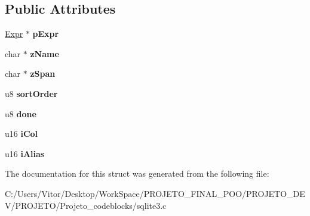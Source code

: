 \subsection*{Public Attributes}
\begin{DoxyCompactItemize}
\item 
\hypertarget{struct_expr_list_1_1_expr_list__item_a75906cf3ff19e5bf16373fec7f3c79ad}{\hyperlink{struct_expr}{Expr} $\ast$ {\bfseries p\-Expr}}\label{struct_expr_list_1_1_expr_list__item_a75906cf3ff19e5bf16373fec7f3c79ad}

\item 
\hypertarget{struct_expr_list_1_1_expr_list__item_af278eb03a1169c73d144547adaf9b04f}{char $\ast$ {\bfseries z\-Name}}\label{struct_expr_list_1_1_expr_list__item_af278eb03a1169c73d144547adaf9b04f}

\item 
\hypertarget{struct_expr_list_1_1_expr_list__item_ade485bb6fafb44ec2aba59d05b8d117b}{char $\ast$ {\bfseries z\-Span}}\label{struct_expr_list_1_1_expr_list__item_ade485bb6fafb44ec2aba59d05b8d117b}

\item 
\hypertarget{struct_expr_list_1_1_expr_list__item_af9084dc073f96792c0c7a8a894778881}{u8 {\bfseries sort\-Order}}\label{struct_expr_list_1_1_expr_list__item_af9084dc073f96792c0c7a8a894778881}

\item 
\hypertarget{struct_expr_list_1_1_expr_list__item_a84aad270c98e28a725a840aac3ee8576}{u8 {\bfseries done}}\label{struct_expr_list_1_1_expr_list__item_a84aad270c98e28a725a840aac3ee8576}

\item 
\hypertarget{struct_expr_list_1_1_expr_list__item_a72cf759413ceea37ddf2a4353cb666c2}{u16 {\bfseries i\-Col}}\label{struct_expr_list_1_1_expr_list__item_a72cf759413ceea37ddf2a4353cb666c2}

\item 
\hypertarget{struct_expr_list_1_1_expr_list__item_a06fc9fdfb94d35ec6ca742da23609239}{u16 {\bfseries i\-Alias}}\label{struct_expr_list_1_1_expr_list__item_a06fc9fdfb94d35ec6ca742da23609239}

\end{DoxyCompactItemize}


The documentation for this struct was generated from the following file\-:\begin{DoxyCompactItemize}
\item 
C\-:/\-Users/\-Vitor/\-Desktop/\-Work\-Space/\-P\-R\-O\-J\-E\-T\-O\-\_\-\-F\-I\-N\-A\-L\-\_\-\-P\-O\-O/\-P\-R\-O\-J\-E\-T\-O\-\_\-\-D\-E\-V/\-P\-R\-O\-J\-E\-T\-O/\-Projeto\-\_\-codeblocks/sqlite3.\-c\end{DoxyCompactItemize}
